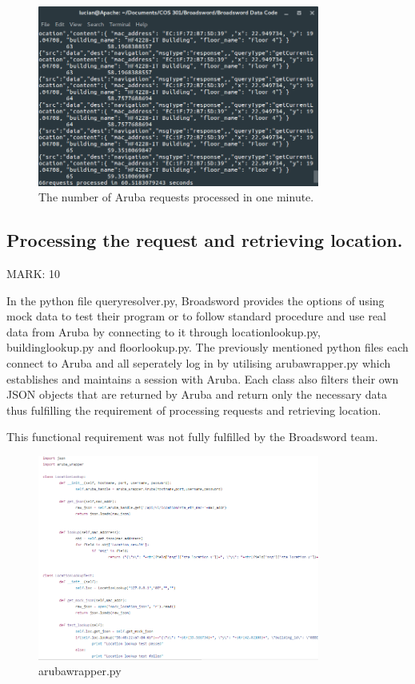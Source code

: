\documentclass{article}
\begin{document}
\begin{figure}[ht]
  \includegraphics[width=350px]{Images/Aruba_Returns.png}
  \caption{The number of Aruba requests processed in one minute.}
  \label{Terminal output.}
\end{figure}




\subsection{Processing the request and retrieving location.}

\begin{flushleft}
MARK: 10
\end{flushleft}

\begin{flushleft}
In the python file query\textunderscore resolver.py, Broadsword provides the options of using mock data to test their program or to follow standard procedure and use real data from Aruba by connecting to it through location\textunderscore lookup.py, building\textunderscore lookup.py and floor\textunderscore lookup.py. The previously mentioned python files each connect to Aruba and all seperately log in by utilising aruba\textunderscore wrapper.py which establishes and maintains a session with Aruba. Each class also filters their own JSON objects that are returned by Aruba and return only the necessary data thus fulfilling the requirement of processing requests and retrieving location. 
\end{flushleft}
  
\begin{flushleft}
This functional requirement was not fully fulfilled by the Broadsword team.
\end{flushleft}

\begin{figure}[ht]
  \includegraphics[width=350px]{Images/getLoc.PNG}
  \caption{aruba\textunderscore wrapper.py}
  \label{arubawrapper.py}
\end{figure}
\end{document}
